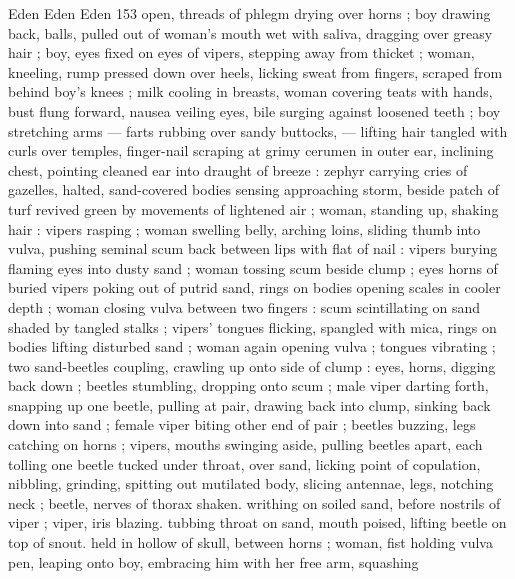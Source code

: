 Eden Eden Eden 153
open, threads of phlegm drying over horns ; boy drawing back, balls,
pulled out of woman's mouth wet with saliva, dragging over greasy
hair ; boy, eyes fixed on eyes of vipers, stepping away from thicket ;
woman, kneeling, rump pressed down over heels, licking sweat from
fingers, scraped from behind boy's knees ; milk cooling in breasts,
woman covering teats with hands, bust flung forward, nausea veiling
eyes, bile surging against loosened teeth ; boy stretching arms —
farts rubbing over sandy buttocks, — lifting hair tangled with curls
over temples, finger-nail scraping at grimy cerumen in outer ear,
inclining chest, pointing cleaned ear into draught of breeze : zephyr
carrying cries of gazelles, halted, sand-covered bodies sensing
approaching storm, beside patch of turf revived green by
movements of lightened air ; woman, standing up, shaking hair :
vipers rasping ; woman swelling belly, arching loins, sliding thumb
into vulva, pushing seminal scum back between lips with flat of nail :
vipers burying flaming eyes into dusty sand ; woman tossing scum
beside clump ; eyes horns of buried vipers poking out of putrid
sand, rings on bodies opening scales in cooler depth ; woman closing
vulva between two fingers : scum scintillating on sand shaded by
tangled stalks ; vipers’ tongues flicking, spangled with mica, rings on
bodies lifting disturbed sand ; woman again opening vulva ; tongues
vibrating ; two sand-beetles coupling, crawling up onto side of clump
: eyes, horns, digging back down ; beetles stumbling, dropping onto
scum ; male viper darting forth, snapping up one beetle, pulling at
pair, drawing back into clump, sinking back down into sand ; female
viper biting other end of pair ; beetles buzzing, legs catching on
horns ; vipers, mouths swinging aside, pulling beetles apart, each
tolling one beetle tucked under throat, over sand, licking point of
copulation, nibbling, grinding, spitting out mutilated body, slicing
antennae, legs, notching neck ; beetle, nerves of thorax shaken.
writhing on soiled sand, before nostrils of viper ; viper, iris blazing.
tubbing throat on sand, mouth poised, lifting beetle on top of snout.
held in hollow of skull, between horns ; woman, fist holding vulva
pen, leaping onto boy, embracing him with her free arm, squashing

